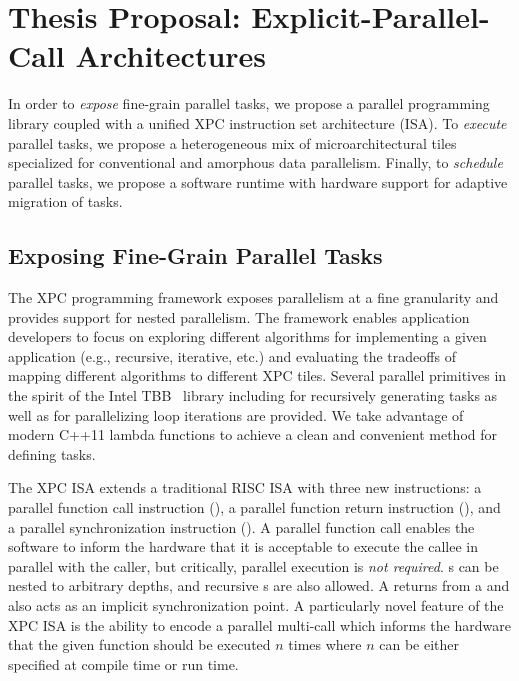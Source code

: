 
\section{Thesis Proposal: Explicit-Parallel-Call Architectures}
\label{sec-xpc}

In order to \emph{expose} fine-grain parallel tasks, we propose a
parallel programming library coupled with a unified XPC instruction set
architecture (ISA). To \emph{execute} parallel tasks, we propose a
heterogeneous mix of microarchitectural tiles specialized for
conventional and amorphous data parallelism. Finally, to \emph{schedule}
parallel tasks, we propose a software runtime with hardware support for
adaptive migration of tasks.

\subsection{Exposing Fine-Grain Parallel Tasks}

The XPC programming framework exposes parallelism at a fine granularity
and provides support for nested parallelism. The framework enables
application developers to focus on exploring different algorithms for
implementing a given application (e.g., recursive, iterative, etc.) and
evaluating the tradeoffs of mapping different algorithms to different XPC
tiles. Several parallel primitives in the spirit of the Intel
TBB~\cite{reinders-tbb-book2007} library including 
for recursively generating tasks as well as  for
parallelizing loop iterations are provided.  We take advantage of modern
C++11 lambda functions to achieve a clean and convenient method for
defining tasks.

The XPC ISA extends a traditional RISC ISA with three new instructions: a
parallel function call instruction (), a parallel function
return instruction (), and a parallel synchronization
instruction (). A parallel function call enables the software
to inform the hardware that it is acceptable to execute the callee in
parallel with the caller, but critically, parallel execution is \emph{not
  required}. s can be nested to arbitrary depths, and recursive
s are also allowed.
A  returns from a  and also acts as an implicit
synchronization point. A particularly novel feature of the XPC ISA is the
ability to encode a parallel multi-call which informs the hardware that
the given function should be executed $n$ times where $n$ can be either
specified at compile time or run time.

